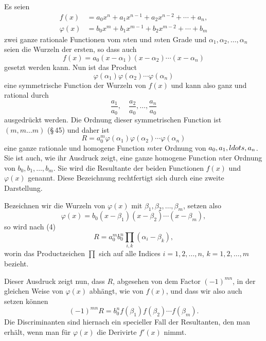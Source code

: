 \documentclass[11pt]{article}
\begin{document}
Es seien
\begin{align}
f(x)&=a_0x^n+a_1x^{n-1}+a_2x^{n-2}+\cdots+a_n,
\tag{1}\\
\varphi(x)&=b_0x^m+b_1x^{m-1}+b_2x^{m-2}+\cdots+b_m
\tag{2}
\end{align}
zwei ganze rationale Functionen vom $n$ten und $m$ten Grade und $\alpha_1,\alpha_2,\ldots,\alpha_n$ seien die Wurzeln der ersten, so dass auch
\begin{equation}
f(x)=a_0(x-\alpha_1)(x-\alpha_2)\cdots(x-\alpha_n)
\tag{3}
\end{equation}
gesetzt werden kann. Nun ist das Product
\[
\varphi(\alpha_1)\varphi(\alpha_2)\cdots\varphi(\alpha_n)
\]
eine symmetrische Function der Wurzeln von $f(x)$ und kann also ganz und rational durch
\[
\frac{a_1}{a_0},\quad \frac{a_2}{a_0},\ldots,\frac{a_n}{a_0}
\]
ausgedrückt werden. Die Ordnung dieser symmetrischen Function ist $(m,m\ldots m)$ (\S\,45) und daher ist
\begin{equation}
R=a_0^m\varphi(\alpha_1)\varphi(\alpha_2)\cdots\varphi(\alpha_n)
\tag{4}
\end{equation}
eine ganze rationale und homogene Function $m$ter Ordnung von $a_0,a_1,\\ldots,a_n$. Sie ist auch, wie ihr Ausdruck zeigt, eine ganze homogene Function $n$ter Ordnung von $b_0,b_1,\ldots,b_m$. Sie wird die Resultante der beiden Functionen $f(x)$ und $\varphi(x)$ genannt. Diese Bezeichnung rechtfertigt sich durch eine zweite Darstellung.

Bezeichnen wir die Wurzeln von $\varphi(x)$ mit $\beta_1,\beta_2,\ldots,\beta_m$, setzen also
\begin{equation}
\varphi(x)=b_0(x-\beta_1)(x-\beta_2)\cdots(x-\beta_m),
\tag{5}
\end{equation}
so wird nach (4)
\begin{equation}
R=a_0^m b_0^n \prod_{i,k}(\alpha_i-\beta_k),
\tag{6}
\end{equation}
worin das Productzeichen $\prod$ sich auf alle Indices $i=1,2,\ldots,n$, $k=1,2,\ldots,m$ bezieht.

Dieser Ausdruck zeigt nun, dass $R$, abgesehen von dem Factor $(-1)^{mn}$, in der gleichen Weise von $\varphi(x)$ abhängt, wie von $f(x)$, und dass wir also auch setzen können
\begin{equation}
(-1)^{mn}R=b_0^n f(\beta_1)f(\beta_2)\cdots f(\beta_m).
\tag{7}
\end{equation}
Die Discriminanten sind hiernach ein specieller Fall der Resultanten, den man erhält, wenn man für $\varphi(x)$ die Derivirte $f'(x)$ nimmt.
\end{document}
